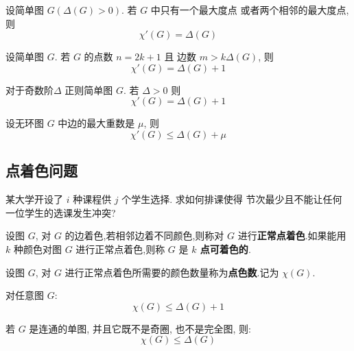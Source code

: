 \begin{definition}
    设简单图 \(G(\Delta(G) > 0)\). 若 \(G\) 中只有一个最大度点
    或者两个相邻的最大度点, 则
    \[\chi'(G) = \Delta(G)\]
\end{definition}

\begin{definition}
    设简单图 \(G\). 若 \(G\) 的点数 \(n = 2k+1\) 且
    边数 \(m > k \Delta(G)\), 则
    \[\chi'(G) = \Delta(G) + 1\]
\end{definition}

\begin{definition}
    对于奇数阶\(\Delta\) 正则简单图 \(G\). 若 \(\Delta > 0\) 则
    \[\chi'(G) = \Delta(G) + 1\]
\end{definition}

\begin{definition}[Vizing]
    设无环图 \(G\) 中边的最大重数是 \(\mu\), 则
    \[\chi'(G) \le \Delta(G) + \mu\]
\end{definition}

\subsection{点着色问题}

\begin{example}[课程安排问题]
    某大学开设了 \(i\) 种课程供 \(j\) 个学生选择. 求如何排课使得
    节次最少且不能让任何一位学生的选课发生冲突?
\end{example}

\begin{definition}[正常点着色]
    设图 $G$, 对 $G$ 的边着色,若相邻边着不同颜色,则称对 
    $G$ 进行\textbf{正常点着色}.如果能用 
    $k$ 种颜色对图 $G$ 进行正常点着色,则称 $G$ 是 \textbf{$k$ 点可着色的}.
\end{definition}

\begin{definition}[点色数]
    设图 $G$, 对 $G$ 进行正常点着色所需要的颜色数量称为\textbf{点色数}.记为 $\chi(G)$.
\end{definition}

\begin{theorem}
    对任意图 \(G\):
    \[\chi(G) \le \Delta(G) + 1\]
\end{theorem}

\begin{theorem}[Brooks]
    若 \(G\) 是连通的单图, 并且它既不是奇圈, 也不是完全图, 则:
    \[\chi(G) \le \Delta(G)\]
\end{theorem}

